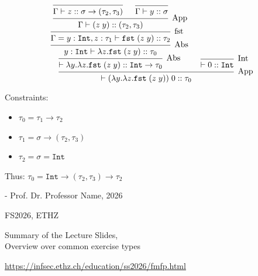\documentclass{article}
\begin{document}
\startDocument
\mediumverticalspacing

\vspace{1cm}
\[
    \begin{prooftree}
        \infer0{\Gamma \vdash z :: \sigma \rightarrow (\tau_2, \tau_3)}
        \infer0{\Gamma \vdash y :: \sigma}
        \infer2[App]{\Gamma \vdash (z\; y) :: (\tau_2, \tau_3)}
        \infer1[fst]{\Gamma = y : \texttt{Int}, z : \tau_1 \vdash \texttt{fst}\; (z\; y) :: \tau_2}
        \infer1[Abs]{y : \texttt{Int} \vdash \lambda z. \texttt{fst}\; (z\; y) :: \tau_0}
        \infer1[Abs]{\vdash \lambda y.\lambda z. \texttt{fst}\; (z\; y) :: \texttt{Int} \rightarrow \tau_0}
        \infer0[Int]{\vdash 0 :: \texttt{Int}}
        \infer2[App]{\vdash (\lambda y.\lambda z. \texttt{fst}\; (z\; y))\; 0 :: \tau_0}
    \end{prooftree}
\]
\vspace{0.1cm}
\begin{center}
    \begin{minipage}{0.2\linewidth}
        Constraints:
        \begin{itemize}
            \item $\tau_0 = \tau_1 \rightarrow \tau_2$
            \item $\tau_1 = \sigma \rightarrow (\tau_2, \tau_3)$
            \item $\tau_2 = \sigma = \texttt{Int}$
        \end{itemize}
    \end{minipage}

    Thus: $\tau_0 = \texttt{Int} \rightarrow (\tau_2, \tau_3) \rightarrow \tau_2$
\end{center}


\vspace{3cm}
\begin{center}
    \begin{Large}
    \end{Large}

    \hspace{3cm} - Prof. Dr. Professor Name, 2026
\end{center}

\vspace{1.5cm}
\begin{center}
    FS2026, ETHZ

    \begin{Large}
        Summary of the Lecture Slides,\\
        Overview over common exercise types
    \end{Large}

    \url{https://infsec.ethz.ch/education/ss2026/fmfp.html}
\end{center}
\end{document}
